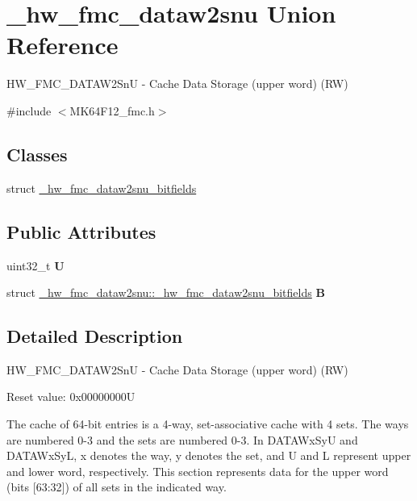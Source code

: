 \hypertarget{union__hw__fmc__dataw2snu}{}\section{\+\_\+hw\+\_\+fmc\+\_\+dataw2snu Union Reference}
\label{union__hw__fmc__dataw2snu}


H\+W\+\_\+\+F\+M\+C\+\_\+\+D\+A\+T\+A\+W2\+SnU -\/ Cache Data Storage (upper word) (RW)  




{\ttfamily \#include $<$M\+K64\+F12\+\_\+fmc.\+h$>$}

\subsection*{Classes}
\begin{DoxyCompactItemize}
\item 
struct \hyperlink{struct__hw__fmc__dataw2snu_1_1__hw__fmc__dataw2snu__bitfields}{\+\_\+hw\+\_\+fmc\+\_\+dataw2snu\+\_\+bitfields}
\end{DoxyCompactItemize}
\subsection*{Public Attributes}
\begin{DoxyCompactItemize}
\item 
uint32\+\_\+t {\bfseries U}\hypertarget{union__hw__fmc__dataw2snu_a1571c56c5f5a04314d90ace4afcebce8}{}\label{union__hw__fmc__dataw2snu_a1571c56c5f5a04314d90ace4afcebce8}

\item 
struct \hyperlink{struct__hw__fmc__dataw2snu_1_1__hw__fmc__dataw2snu__bitfields}{\+\_\+hw\+\_\+fmc\+\_\+dataw2snu\+::\+\_\+hw\+\_\+fmc\+\_\+dataw2snu\+\_\+bitfields} {\bfseries B}\hypertarget{union__hw__fmc__dataw2snu_a9423b69b958f72ab670de3ba17520686}{}\label{union__hw__fmc__dataw2snu_a9423b69b958f72ab670de3ba17520686}

\end{DoxyCompactItemize}


\subsection{Detailed Description}
H\+W\+\_\+\+F\+M\+C\+\_\+\+D\+A\+T\+A\+W2\+SnU -\/ Cache Data Storage (upper word) (RW) 

Reset value\+: 0x00000000U

The cache of 64-\/bit entries is a 4-\/way, set-\/associative cache with 4 sets. The ways are numbered 0-\/3 and the sets are numbered 0-\/3. In D\+A\+T\+A\+Wx\+SyU and D\+A\+T\+A\+Wx\+SyL, x denotes the way, y denotes the set, and U and L represent upper and lower word, respectively. This section represents data for the upper word (bits \mbox{[}63\+:32\mbox{]}) of all sets in the indicated way. 

